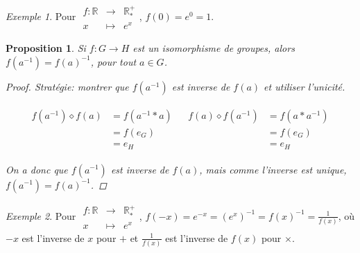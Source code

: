 \documentclass{report}
\newcommand*{\reels}{\mathbb{R}}
\newtheorem*{prop}{Proposition}
\theoremstyle{definition}
\theoremstyle{remark}
\newtheorem*{exem}{Exemple}
\begin{document}
	\begin{exem}
		Pour $\begin{array}{rcl}
			f:\reels&\to&\reels^+_*\\
			x&\mapsto&e^x
		\end{array}$, $f(0)=e^0=1$.
	\end{exem}
	\begin{prop}
		Si $f:G \to H$ est un isomorphisme de groupes, alors $f(a^{-1})=f(a)^{-1}$, pour tout $a \in G$.
		\begin{proof}
			Strat\'egie: montrer que $f(a^{-1})$ est inverse de $f(a)$ et utiliser l'unicit\'e.

			\begin{align*}
				\begin{split}
					f(a^{-1}) \diamond f(a)&= f(a^{-1}*a)\\
					&= f(e_G)\\
					&= e_H
				\end{split}
				&
				\begin{split}
					f(a) \diamond f(a^{-1})&= f(a*a^{-1})\\
					&= f(e_G)\\
					&= e_H
				\end{split}
			\end{align*}

			On a donc que $f(a^{-1})$ est inverse de $f(a)$, mais comme l'inverse est unique, $f(a^{-1})=f(a)^{-1}$.
		\end{proof}
	\end{prop}
	\begin{exem}
		Pour $\begin{array}{rcl}
			f:\reels&\to&\reels^+_*\\
			x&\mapsto&e^x
		\end{array}$, $f(-x)=e^{-x}=(e^x)^{-1}=f(x)^{-1}=\frac{1}{f(x)}$, o\`u $-x$ est l'inverse de $x$ pour $+$ et $\frac{1}{f(x)}$ est l'inverse de $f(x)$ pour $\times$.
	\end{exem}
\end{document}
